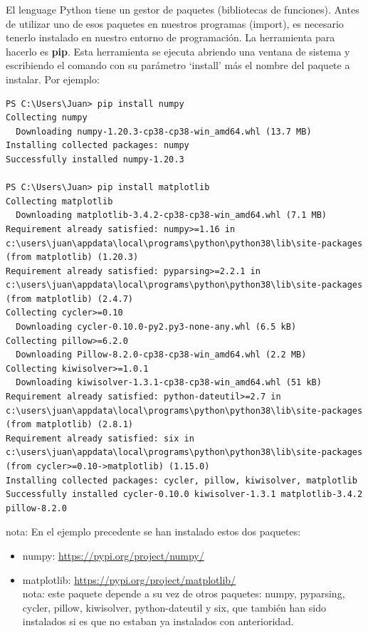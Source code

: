 \documentclass[spanish,12pt,a4paper,final,oneside]{book}
\begin{document}
El lenguage Python tiene un gestor de paquetes (bibliotecas de funciones). Antes de utilizar uno de esos paquetes en nuestros programas (import), es necesario tenerlo instalado en nuestro entorno de programación. La herramienta para hacerlo es \textbf{pip}. Esta herramienta se ejecuta  abriendo una ventana de sistema y escribiendo el comando con su parámetro `install' más el nombre del paquete a instalar. Por ejemplo:
\begin{lstlisting}
PS C:\Users\Juan> pip install numpy
Collecting numpy
  Downloading numpy-1.20.3-cp38-cp38-win_amd64.whl (13.7 MB)
Installing collected packages: numpy
Successfully installed numpy-1.20.3

PS C:\Users\Juan> pip install matplotlib
Collecting matplotlib
  Downloading matplotlib-3.4.2-cp38-cp38-win_amd64.whl (7.1 MB)
Requirement already satisfied: numpy>=1.16 in c:\users\juan\appdata\local\programs\python\python38\lib\site-packages (from matplotlib) (1.20.3)
Requirement already satisfied: pyparsing>=2.2.1 in c:\users\juan\appdata\local\programs\python\python38\lib\site-packages (from matplotlib) (2.4.7)
Collecting cycler>=0.10
  Downloading cycler-0.10.0-py2.py3-none-any.whl (6.5 kB)
Collecting pillow>=6.2.0
  Downloading Pillow-8.2.0-cp38-cp38-win_amd64.whl (2.2 MB)
Collecting kiwisolver>=1.0.1
  Downloading kiwisolver-1.3.1-cp38-cp38-win_amd64.whl (51 kB)
Requirement already satisfied: python-dateutil>=2.7 in c:\users\juan\appdata\local\programs\python\python38\lib\site-packages (from matplotlib) (2.8.1)
Requirement already satisfied: six in c:\users\juan\appdata\local\programs\python\python38\lib\site-packages (from cycler>=0.10->matplotlib) (1.15.0)
Installing collected packages: cycler, pillow, kiwisolver, matplotlib
Successfully installed cycler-0.10.0 kiwisolver-1.3.1 matplotlib-3.4.2 pillow-8.2.0
\end{lstlisting}

nota: En el ejemplo precedente se han instalado estos dos paquetes:
\begin{itemize}
\item numpy: \url{https://pypi.org/project/numpy/}
\item matplotlib: \url{https://pypi.org/project/matplotlib/}
\\{\footnotesize nota: este paquete depende a su vez de otros paquetes: numpy, pyparsing, cycler, pillow, kiwisolver, python-dateutil y six, que también han sido instalados si es que no estaban ya instalados con anterioridad.}
\end{itemize}
\end{document}
